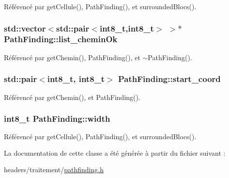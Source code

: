 Référencé par get\-Cellule(), Path\-Finding(), et surrounded\-Blocs().

\hypertarget{classPathFinding_a1c1b4bc29b0f8a74f80d2601c83844aa}{
\subsubsection[{list\-\_\-chemin\-Ok}]{\setlength{\rightskip}{0pt plus 5cm}std\-::vector$<$std\-::pair$<$int8\-\_\-t,int8\-\_\-t$>$ $>$$\ast$ Path\-Finding\-::list\-\_\-chemin\-Ok\hspace{0.3cm}{\ttfamily [private]}}}\label{classPathFinding_a1c1b4bc29b0f8a74f80d2601c83844aa}


Référencé par get\-Chemin(), Path\-Finding(), et $\sim$\-Path\-Finding().

\hypertarget{classPathFinding_a33dac4c9b17f5e6032bc0fc60e7a8249}{
\subsubsection[{start\-\_\-coord}]{\setlength{\rightskip}{0pt plus 5cm}std\-::pair$<$int8\-\_\-t, int8\-\_\-t$>$ Path\-Finding\-::start\-\_\-coord\hspace{0.3cm}{\ttfamily [private]}}}\label{classPathFinding_a33dac4c9b17f5e6032bc0fc60e7a8249}


Référencé par get\-Chemin(), et Path\-Finding().

\hypertarget{classPathFinding_a50f9513402ad1113678635c3eb9da62d}{
\subsubsection[{width}]{\setlength{\rightskip}{0pt plus 5cm}int8\-\_\-t Path\-Finding\-::width\hspace{0.3cm}{\ttfamily [private]}}}\label{classPathFinding_a50f9513402ad1113678635c3eb9da62d}


Référencé par get\-Cellule(), Path\-Finding(), et surrounded\-Blocs().



La documentation de cette classe a été générée à partir du fichier suivant \-:\begin{DoxyCompactItemize}
\item 
headers/traitement/\hyperlink{pathfinding_8h}{pathfinding.\-h}\end{DoxyCompactItemize}
